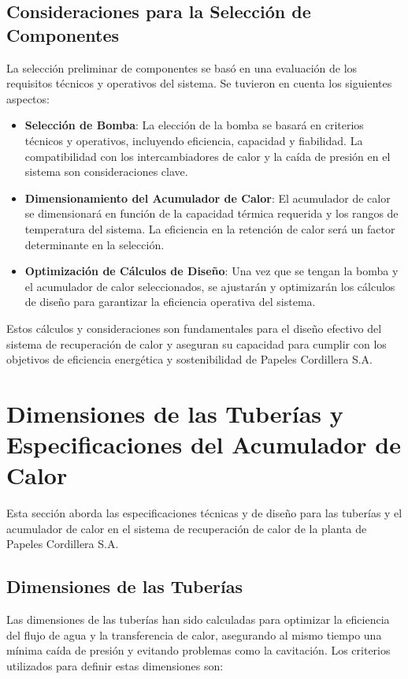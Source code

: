 \documentclass[11pt,a4paper]{article}  %
\begin{document}
\subsection{Consideraciones para la Selección de Componentes}
La selección preliminar de componentes se basó en una evaluación de los requisitos técnicos y operativos del sistema. Se tuvieron en cuenta los siguientes aspectos:
\begin{itemize}
    \item \textbf{Selección de Bomba}: La elección de la bomba se basará en criterios técnicos y operativos, incluyendo eficiencia, capacidad y fiabilidad. La compatibilidad con los intercambiadores de calor y la caída de presión en el sistema son consideraciones clave.
    
    \item \textbf{Dimensionamiento del Acumulador de Calor}: El acumulador de calor se dimensionará en función de la capacidad térmica requerida y los rangos de temperatura del sistema. La eficiencia en la retención de calor será un factor determinante en la selección.
    
    \item \textbf{Optimización de Cálculos de Diseño}: Una vez que se tengan la bomba y el acumulador de calor seleccionados, se ajustarán y optimizarán los cálculos de diseño para garantizar la eficiencia operativa del sistema.
\end{itemize}

Estos cálculos y consideraciones son fundamentales para el diseño efectivo del sistema de recuperación de calor y aseguran su capacidad para cumplir con los objetivos de eficiencia energética y sostenibilidad de Papeles Cordillera S.A.

\section{Dimensiones de las Tuberías y Especificaciones del Acumulador de Calor}

Esta sección aborda las especificaciones técnicas y de diseño para las tuberías y el acumulador de calor en el sistema de recuperación de calor de la planta de Papeles Cordillera S.A.

\subsection{Dimensiones de las Tuberías}
Las dimensiones de las tuberías han sido calculadas para optimizar la eficiencia del flujo de agua y la transferencia de calor, asegurando al mismo tiempo una mínima caída de presión y evitando problemas como la cavitación. Los criterios utilizados para definir estas dimensiones son:
\end{document}
